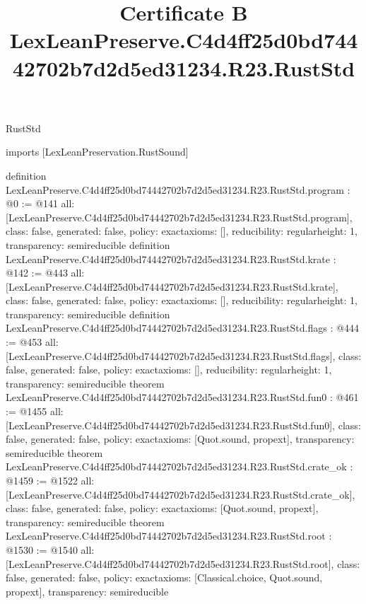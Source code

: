 \begin{lexlean}{RustStd}
\title{Certificate B LexLeanPreserve.C4d4ff25d0bd74442702b7d2d5ed31234.R23.RustStd}
\begin{coremodule}
imports [LexLeanPreservation.RustSound]

definition LexLeanPreserve.C4d4ff25d0bd74442702b7d2d5ed31234.R23.RustStd.program : @0 := @141 {
  all: [LexLeanPreserve.C4d4ff25d0bd74442702b7d2d5ed31234.R23.RustStd.program],
  class: false,
  generated: false,
  policy: exact{axioms: []},
  reducibility: regular{height: 1},
  transparency: semireducible
}
definition LexLeanPreserve.C4d4ff25d0bd74442702b7d2d5ed31234.R23.RustStd.krate : @142 := @443 {
  all: [LexLeanPreserve.C4d4ff25d0bd74442702b7d2d5ed31234.R23.RustStd.krate],
  class: false,
  generated: false,
  policy: exact{axioms: []},
  reducibility: regular{height: 1},
  transparency: semireducible
}
definition LexLeanPreserve.C4d4ff25d0bd74442702b7d2d5ed31234.R23.RustStd.flags : @444 := @453 {
  all: [LexLeanPreserve.C4d4ff25d0bd74442702b7d2d5ed31234.R23.RustStd.flags],
  class: false,
  generated: false,
  policy: exact{axioms: []},
  reducibility: regular{height: 1},
  transparency: semireducible
}
theorem LexLeanPreserve.C4d4ff25d0bd74442702b7d2d5ed31234.R23.RustStd.fun0 : @461 := @1455 {
  all: [LexLeanPreserve.C4d4ff25d0bd74442702b7d2d5ed31234.R23.RustStd.fun0],
  class: false,
  generated: false,
  policy: exact{axioms: [Quot.sound, propext]},
  transparency: semireducible
}
theorem LexLeanPreserve.C4d4ff25d0bd74442702b7d2d5ed31234.R23.RustStd.crate_ok : @1459 := @1522 {
  all: [LexLeanPreserve.C4d4ff25d0bd74442702b7d2d5ed31234.R23.RustStd.crate_ok],
  class: false,
  generated: false,
  policy: exact{axioms: [Quot.sound, propext]},
  transparency: semireducible
}
theorem LexLeanPreserve.C4d4ff25d0bd74442702b7d2d5ed31234.R23.RustStd.root : @1530 := @1540 {
  all: [LexLeanPreserve.C4d4ff25d0bd74442702b7d2d5ed31234.R23.RustStd.root],
  class: false,
  generated: false,
  policy: exact{axioms: [Classical.choice, Quot.sound, propext]},
  transparency: semireducible
}


\end{coremodule}
\end{lexlean}
